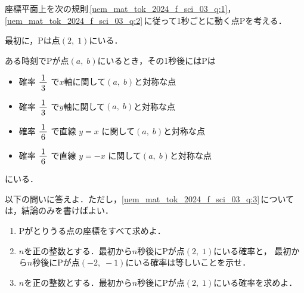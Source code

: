 ﻿\documentclass[../../../uem_mat_tok_q.tex]{subfiles}
\begin{document}
    座標平面上を次の規則\,\ref{uem_mat_tok_2024_f_sci_03_q:1}，%
    \ref{uem_mat_tok_2024_f_sci_03_q:2}\,に従って1秒ごとに動く点Pを考える．

    \begin{myenua}
        \item 最初に，Pは点$(2,\;1)$にいる．\label{uem_mat_tok_2024_f_sci_03_q:1}
        \item ある時刻でPが点$(a,\;b)$にいるとき，その1秒後にはPは
            
            \begin{itemize}[label={\textbullet}, leftmargin=2\zw, labelsep=.4\zw,
                topsep=1pt, itemsep=1pt]
                \item 確率 $\myfraca{1}{3}$ で$x$軸に関して$(a,\;b)$と対称な点
                \item 確率 $\myfraca{1}{3}$ で$y$軸に関して$(a,\;b)$と対称な点
                \item 確率 $\myfraca{1}{6}$ で直線 $y=x$ に関して$(a,\;b)$と対称な点
                \item 確率 $\myfraca{1}{6}$ で直線 $y=-x$ に関して$(a,\;b)$と対称な点
            \end{itemize}
            にいる．
            \label{uem_mat_tok_2024_f_sci_03_q:2}
    \end{myenua}
    以下の問いに答えよ．ただし，\ref{uem_mat_tok_2024_f_sci_03_q:3}\,については，結論のみを書けばよい．
    \begin{enumerate}
        \item Pがとりうる点の座標をすべて求めよ．\label{uem_mat_tok_2024_f_sci_03_q:3}
        \item $n$を正の整数とする．最初から$n$秒後にPが点$(2,\;1)$にいる確率と，%
            最初から$n$秒後にPが点$(-2,\;-1)$にいる確率は等しいことを示せ．
        \item $n$を正の整数とする．最初から$n$秒後にPが点$(2,\;1)$にいる確率を求めよ．
    \end{enumerate}
\end{document}
